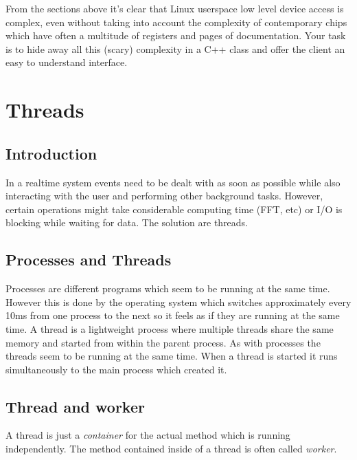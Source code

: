 \documentclass[12pt]{report}
\begin{document}
From the sections above it's clear that Linux userspace low level
device access is complex, even without taking into account the
complexity of contemporary chips which have often a multitude of
registers and pages of documentation. Your task is to hide away
all this (scary) complexity in a C++ class and offer the client
an easy to understand interface.





\chapter{Threads}

\section{Introduction}
In a realtime system events need to be dealt with as soon as possible
while also interacting with the user and performing other background
tasks. However, certain operations might take considerable computing
time (FFT, etc) or I/O is blocking while waiting for data. The
solution are threads.


\section{Processes and Threads}
Processes are different programs which seem to be running at the same
time. However this is done by the operating system which switches
approximately every 10ms from one process to the next so it feels as
if they are running at the same time. A thread is a lightweight
process where multiple threads share the same memory and started from
within the parent process. As with processes the threads seem to be
running at the same time. When a thread is started it runs
simultaneously to the main process which created it.

\section{Thread and worker}
A thread is just a \textsl{container} for the actual method
which is running independently. The method contained inside of a
thread is often called \textsl{worker}.
\end{document}
